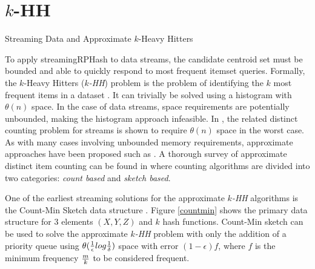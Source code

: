 \section{$k$-HH}{Streaming Data and Approximate $k$-Heavy Hitters}

To apply \textsf{streamingRPHash} to data streams, the candidate centroid set must be bounded and able to quickly
respond to most frequent itemset queries.  Formally, the $k$-Heavy Hitters (\emph{$k$-HH}) problem is the problem of
identifying the $k$ most frequent items in a dataset \cite{cormode}.  It can trivially be solved using a histogram with
$\theta(n)$ space.  In the case of data streams, space requirements are potentially unbounded, making the histogram
approach infeasible.  In \cite{alon1996}, the related distinct counting problem for streams is shown to require
$\theta(n)$ space in the worst case.  As with many cases involving unbounded memory requirements, approximate approaches
have been proposed such as \cite{karp-03,morris-78,Manku}.  A thorough survey of approximate distinct item counting can
be found in \cite{cormode3} where counting algorithms are divided into two categories: \emph{count based} and
\emph{sketch based}.

One of the earliest streaming solutions for the approximate \emph{$k$-HH} algorithms is the Count-Min Sketch data
structure \cite{cormode2}.  Figure \ref{countmin} shows the primary data structure for 3 elements $(X,Y,Z)$ and $k$ hash
functions.  Count-Min sketch can be used to solve the approximate \emph{$k$-HH} problem with only the addition of a
priority queue using $\theta({1\over \epsilon} log {1 \over \delta})$ space with error $(1-\epsilon)f$, where $f$ is the
minimum frequency $m \over k$ to be considered frequent.


